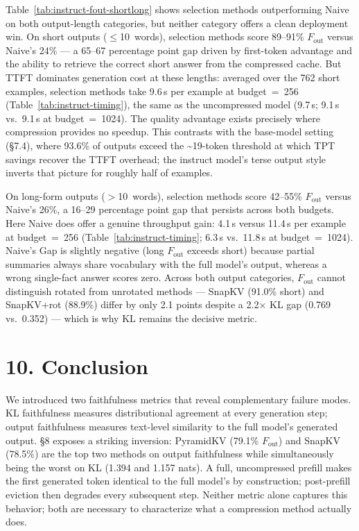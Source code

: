\documentclass[10pt,letterpaper]{article}
\begin{document}
Table~\ref{tab:instruct-fout-shortlong} shows selection methods outperforming
Naive on both output-length categories, but neither category offers a clean
deployment win. On short outputs ($\leq$10~words), selection methods score
89--91\% \(F_{\text{out}}\) versus Naive's 24\% --- a 65--67 percentage point
gap driven by first-token advantage and the ability to retrieve the correct
short answer from the compressed cache. But TTFT dominates generation cost at
these lengths: averaged over the 762 short examples, selection methods take
9.6\,s per example at budget~=~256 (Table~\ref{tab:instruct-timing}), the same
as the uncompressed model (9.7\,s; 9.1\,s vs.\ 9.1\,s at budget~=~1024). The
quality advantage exists precisely where compression provides no speedup. This
contrasts with the base-model setting (§7.4), where 93.6\% of outputs exceed
the \textasciitilde19-token threshold at which TPT savings recover the TTFT
overhead; the instruct model's terse output style inverts that picture for
roughly half of examples.

On long-form outputs ($>$10~words), selection methods score 42--55\%
\(F_{\text{out}}\) versus Naive's 26\%, a 16--29 percentage point gap that
persists across both budgets. Here Naive does offer a genuine throughput gain:
4.1\,s versus 11.4\,s per example at budget~=~256 (Table~\ref{tab:instruct-timing};
6.3\,s vs.\ 11.8\,s at budget~=~1024). Naive's Gap is slightly negative (long $F_{\text{out}}$ exceeds
short) because partial summaries always share vocabulary with the full model's
output, whereas a wrong single-fact answer scores zero. Across both output
categories, \(F_{\text{out}}\) cannot distinguish rotated from unrotated
methods --- SnapKV (91.0\% short) and SnapKV+rot (88.9\%) differ by only 2.1
points despite a 2.2$\times$ KL gap (0.769 vs.\ 0.352) ---
which is why KL remains the decisive metric.

\hypertarget{conclusion}{%
\section{10. Conclusion}\label{conclusion}}

We introduced two faithfulness metrics that reveal complementary failure
modes. KL faithfulness measures distributional agreement at every
generation step; output faithfulness measures text-level similarity to
the full model's generated output. §8 exposes a striking inversion:
PyramidKV (79.1\% \(F_{\text{out}}\)) and SnapKV (78.5\%) are the top
two methods on output faithfulness while simultaneously being the worst
on KL (1.394 and 1.157 nats). A full, uncompressed prefill makes the
first generated token identical to the full model's by construction;
post-prefill eviction then degrades every subsequent step. Neither
metric alone captures this behavior; both are necessary to characterize
what a compression method actually does.
\end{document}
